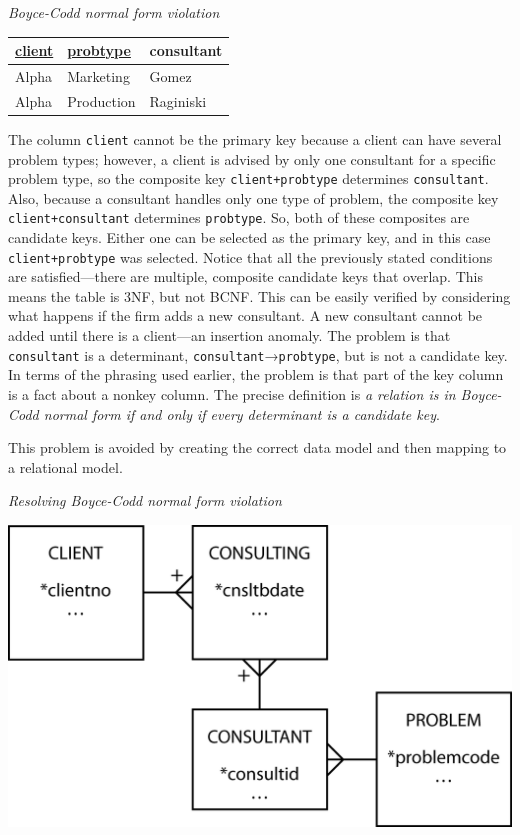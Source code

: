 \documentclass[
]{article}
\begin{document}
\emph{Boyce-Codd normal form violation}

\begin{longtable}[]{@{}lll@{}}
\toprule
\underline{client} & \underline{probtype} & consultant \\
\midrule
\endhead
Alpha & Marketing & Gomez \\
Alpha & Production & Raginiski \\
\bottomrule
\end{longtable}

The column \texttt{client} cannot be the primary key because a client can have
several problem types; however, a client is advised by only one
consultant for a specific problem type, so the composite key
\texttt{client+probtype} determines \texttt{consultant}. Also, because a consultant
handles only one type of problem, the composite key \texttt{client+consultant}
determines \texttt{probtype}. So, both of these composites are candidate keys.
Either one can be selected as the primary key, and in this case
\texttt{client+probtype} was selected. Notice that all the previously stated
conditions are satisfied---there are multiple, composite candidate keys
that overlap. This means the table is 3NF, but not BCNF. This can be
easily verified by considering what happens if the firm adds a new
consultant. A new consultant cannot be added until there is a
client---an insertion anomaly. The problem is that \texttt{consultant} is a
determinant, \texttt{consultant}→\texttt{probtype}, but is not a candidate key. In
terms of the phrasing used earlier, the problem is that part of the key
column is a fact about a nonkey column. The precise definition is \emph{a
relation is in Boyce-Codd normal form if and only if every determinant
is a candidate key}.

This problem is avoided by creating the correct data model and then
mapping to a relational model.

\emph{Resolving Boyce-Codd normal form violation}

\includegraphics[width=6.25in,height=\textheight]{Figures/Chapter 8/BCNF.png}
\end{document}
